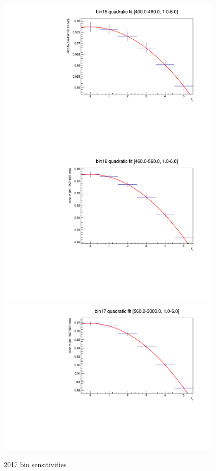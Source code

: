 \begin{figure}
\includegraphics[width=.32\linewidth]{quadplots/2017bin15.pdf}
\includegraphics[width=.32\linewidth]{quadplots/2017bin16.pdf}
\includegraphics[width=.32\linewidth]{quadplots/2017bin17.pdf}
\caption{2017 bin sensitivities}
\label{fig:2017bins}
\end{figure}

